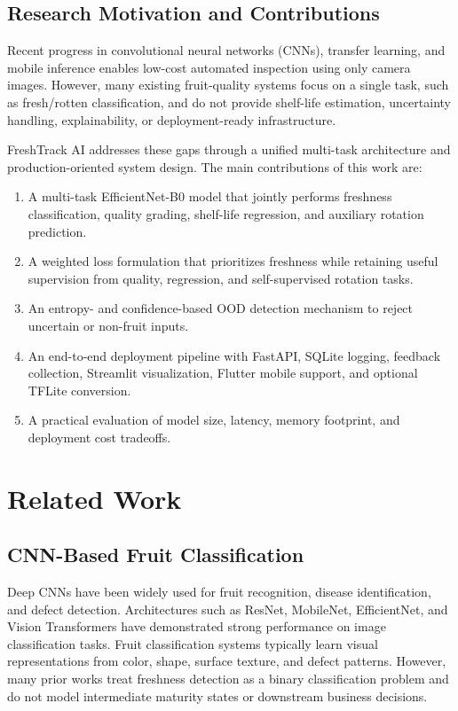\documentclass[conference]{IEEEtran}
\begin{document}
\subsection{Research Motivation and Contributions}
Recent progress in convolutional neural networks (CNNs), transfer learning, and mobile inference enables low-cost automated inspection using only camera images. However, many existing fruit-quality systems focus on a single task, such as fresh/rotten classification, and do not provide shelf-life estimation, uncertainty handling, explainability, or deployment-ready infrastructure.

FreshTrack AI addresses these gaps through a unified multi-task architecture and production-oriented system design. The main contributions of this work are:
\begin{enumerate}
    \item A multi-task EfficientNet-B0 model that jointly performs freshness classification, quality grading, shelf-life regression, and auxiliary rotation prediction.
    \item A weighted loss formulation that prioritizes freshness while retaining useful supervision from quality, regression, and self-supervised rotation tasks.
    \item An entropy- and confidence-based OOD detection mechanism to reject uncertain or non-fruit inputs.
    \item An end-to-end deployment pipeline with FastAPI, SQLite logging, feedback collection, Streamlit visualization, Flutter mobile support, and optional TFLite conversion.
    \item A practical evaluation of model size, latency, memory footprint, and deployment cost tradeoffs.
\end{enumerate}

\section{Related Work}
\subsection{CNN-Based Fruit Classification}
Deep CNNs have been widely used for fruit recognition, disease identification, and defect detection. Architectures such as ResNet, MobileNet, EfficientNet, and Vision Transformers have demonstrated strong performance on image classification tasks. Fruit classification systems typically learn visual representations from color, shape, surface texture, and defect patterns. However, many prior works treat freshness detection as a binary classification problem and do not model intermediate maturity states or downstream business decisions.
\end{document}
